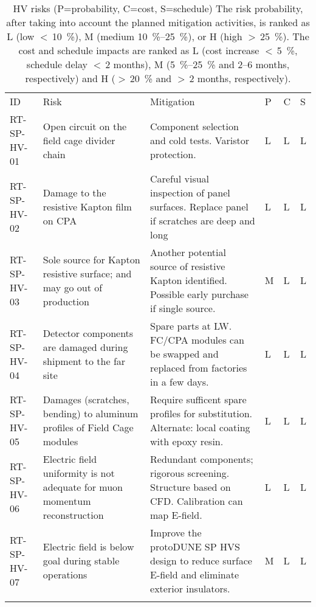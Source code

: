 
\begin{footnotesize}
\begin{longtable}{P{0.18\textwidth}P{0.20\textwidth}P{0.32\textwidth}P{0.02\textwidth}P{0.02\textwidth}P{0.02\textwidth}} 
\caption[HV risks]{HV risks (P=probability, C=cost, S=schedule) The risk probability, after taking into account the planned mitigation activities, is ranked as 
L (low $<\,$\SI{10}{\%}), 
M (medium \SIrange{10}{25}{\%}), or 
H (high $>\,$\SI{25}{\%}). 
The cost and schedule impacts are ranked as 
L (cost increase $<\,$\SI{5}{\%}, schedule delay $<\,$\num{2} months), 
M (\SIrange{5}{25}{\%} and 2--6 months, respectively) and 
H ($>\,$\SI{20}{\%} and $>\,$2 months, respectively).  } \\
ID & Risk & Mitigation & P & C & S  \\  \colhline
RT-SP-HV-01 & Open circuit on the field cage divider chain & Component selection and cold tests. Varistor protection. & L & L & L \\  \colhline
RT-SP-HV-02 & Damage to the resistive Kapton film on CPA & Careful visual inspection of panel surfaces.  Replace panel if scratches are deep and long  & L & L & L \\  \colhline
RT-SP-HV-03 & Sole source for Kapton resistive surface; and may go out of production & Another potential source of resistive Kapton identified. Possible early purchase if single source. & M & L & L \\  \colhline
RT-SP-HV-04 & Detector components are damaged during shipment to the far site  & Spare parts at  LW. FC/CPA modules can be swapped and replaced from factories in a few days. & L & L & L \\  \colhline
RT-SP-HV-05 & Damages (scratches, bending) to aluminum profiles of Field Cage modules & Require sufficent spare profiles for substitution. Alternate: local coating with epoxy resin. & L & L & L \\  \colhline
RT-SP-HV-06 & Electric field uniformity is not adequate for muon momentum reconstruction  & Redundant components; rigorous screening. Structure based on CFD. Calibration can map E-field. & L & L & L \\  \colhline
RT-SP-HV-07 & Electric field is below goal during stable operations & Improve the protoDUNE SP HVS design to reduce surface E-field and eliminate exterior insulators. & M & L & L \\  \colhline

\end{longtable}
\end{footnotesize}
